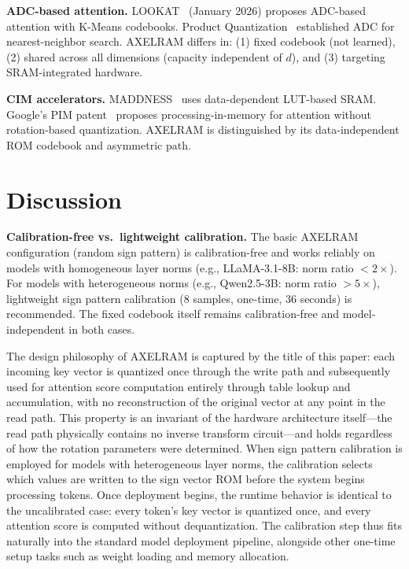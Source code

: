 \documentclass[conference]{IEEEtran}
\begin{document}
\textbf{ADC-based attention.}
LOOKAT~\cite{lookat} (January 2026) proposes ADC-based attention with K-Means codebooks.
Product Quantization~\cite{jegou2011} established ADC for nearest-neighbor search.
AXELRAM differs in: (1) fixed codebook (not learned), (2) shared across all dimensions (capacity independent of $d$), and (3) targeting SRAM-integrated hardware.

\textbf{CIM accelerators.}
MADDNESS~\cite{maddness} uses data-dependent LUT-based SRAM.
Google's PIM patent~\cite{google_pim} proposes processing-in-memory for attention without rotation-based quantization.
AXELRAM is distinguished by its data-independent ROM codebook and asymmetric path.

\section{Discussion}

\textbf{Calibration-free vs.\ lightweight calibration.}
The basic AXELRAM configuration (random sign pattern) is calibration-free and works reliably on models with homogeneous layer norms (e.g., LLaMA-3.1-8B: norm ratio $< 2\times$).
For models with heterogeneous norms (e.g., Qwen2.5-3B: norm ratio $> 5\times$), lightweight sign pattern calibration (8 samples, one-time, 36 seconds) is recommended.
The fixed codebook itself remains calibration-free and model-independent in both cases.

The design philosophy of AXELRAM is captured by the title of this paper: each incoming key vector is quantized once through the write path and subsequently used for attention score computation entirely through table lookup and accumulation, with no reconstruction of the original vector at any point in the read path.
This property is an invariant of the hardware architecture itself---the read path physically contains no inverse transform circuit---and holds regardless of how the rotation parameters were determined.
When sign pattern calibration is employed for models with heterogeneous layer norms, the calibration selects which values are written to the sign vector ROM before the system begins processing tokens.
Once deployment begins, the runtime behavior is identical to the uncalibrated case: every token's key vector is quantized once, and every attention score is computed without dequantization.
The calibration step thus fits naturally into the standard model deployment pipeline, alongside other one-time setup tasks such as weight loading and memory allocation.
\end{document}
